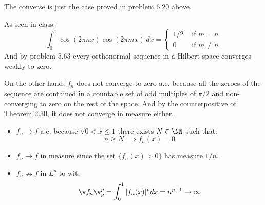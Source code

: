 The converse is just the case proved in problem 6.20 above.

As seen in class:
\[
    \int_0^{1}\cos(2\pi nx)\cos(2\pi mx)\, dx=\begin{cases}
        1/2 & \text{ if } m=n\\
        0   & \text{ if } m\neq n
\end{cases}\]
And by problem 5.63 every orthonormal sequence in a Hilbert space converges weakly to zero.

On the other hand, $f_n$ does not converge to zero a.e. because all the zeroes of the sequence are contained in a countable set of odd multiples of $\pi/2$ and non-converging to zero on the rest of the space. And by the counterpositive of Theorem 2.30, it does not converge in measure either.

\begin{itemize}
    \item $f_n \to f$ a.e. because $\forall 0<x\leq 1$ there exists $N\in\NN$ such that:
        $$n\geq N \implies f_n(x)=0$$
    \item $f_n\to f$ in measure since the set $\{ f_n(x)>0\}$ has measure $1/n$.
    \item $f_n\nrightarrow f$ in $L^p$ to wit:
        $$\v f_n\v_p^p = \int_0^1 |f_n(x)|^pdx = n^{p-1}\to \infty$$
\end{itemize}
